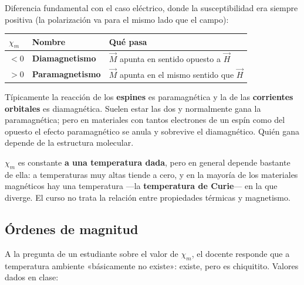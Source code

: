 \documentclass[12pt,a4paper]{article}
\begin{document}
Diferencia fundamental con el caso eléctrico, donde la susceptibilidad era
siempre positiva (la polarización va para el mismo lado que el campo):

\begin{center}
\renewcommand{\arraystretch}{1.35}
\small
\begin{tabularx}{\textwidth}{l>{\raggedright\arraybackslash}X>{\raggedright\arraybackslash}X}
\toprule
\textbf{$\chi_m$} & \textbf{Nombre} & \textbf{Qué pasa} \\
\midrule
$< 0$ & \textbf{Diamagnetismo} & $\vec M$ apunta en sentido opuesto a $\vec H$ \\
$> 0$ & \textbf{Paramagnetismo} & $\vec M$ apunta en el mismo sentido que $\vec H$ \\
\bottomrule
\end{tabularx}
\end{center}

Típicamente la reacción de los \textbf{espines} es paramagnética y la de las
\textbf{corrientes orbitales} es diamagnética. Suelen estar las dos y normalmente
gana la paramagnética; pero en materiales con tantos electrones de un espín
como del opuesto el efecto paramagnético se anula y sobrevive el diamagnético.
Quién gana depende de la estructura molecular.

\begin{notebox}
$\chi_m$ es constante \textbf{a una temperatura dada}, pero en general depende
bastante de ella: a temperaturas muy altas tiende a cero, y en la mayoría de
los materiales magnéticos hay una temperatura ---la \textbf{temperatura de Curie}---
en la que diverge. El curso no trata la relación entre propiedades térmicas y
magnetismo.
\end{notebox}

\subsection{Órdenes de magnitud}

A la pregunta de un estudiante sobre el valor de $\chi_m$, el docente responde
que a temperatura ambiente «básicamente no existe»: existe, pero es
chiquitito. Valores dados en clase:
\end{document}
